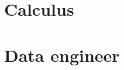 \documentclass{article}
\begin{document}
\section{Calculus}

\section{Data engineer}

\end{document}
